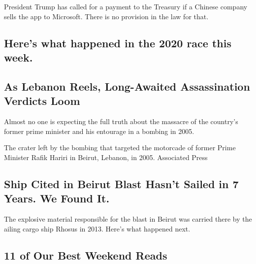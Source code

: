 President Trump has called for a payment to the Treasury if a Chinese
company sells the app to Microsoft. There is no provision in the law for
that.

\href{/2020/08/08/us/politics/trump-biden-polls-interview.html}{}

\hypertarget{heres-what-happened-in-the-2020-race-this-week}{%
\subsection{Here's what happened in the 2020 race this
week.}\label{heres-what-happened-in-the-2020-race-this-week}}

\href{/2020/08/08/world/middleeast/hariri-assassination-trial-hague.html}{}

\hypertarget{as-lebanon-reels-long-awaited-assassination-verdicts-loom}{%
\subsection{As Lebanon Reels, Long-Awaited Assassination Verdicts
Loom}\label{as-lebanon-reels-long-awaited-assassination-verdicts-loom}}

Almost no one is expecting the full truth about the massacre of the
country's former prime minister and his entourage in a bombing in 2005.

\href{/2020/08/08/world/middleeast/hariri-assassination-trial-hague.html}{}

The crater left by the bombing that targeted the motorcade of former
Prime Minister Rafik Hariri in Beirut, Lebanon, in 2005. Associated
Press

\href{/2020/08/07/world/middleeast/lebanon-explosion-ship.html}{}

\hypertarget{ship-cited-in-beirut-blast-hasnt-sailed-in-7-years-we-found-it}{%
\subsection{Ship Cited in Beirut Blast Hasn't Sailed in 7 Years. We
Found
It.}\label{ship-cited-in-beirut-blast-hasnt-sailed-in-7-years-we-found-it}}

The explosive material responsible for the blast in Beirut was carried
there by the ailing cargo ship Rhosus in 2013. Here's what happened
next.

\href{/2020/08/07/briefing/best-weekend-reads.html}{}

\hypertarget{11-of-our-best-weekend-reads}{%
\subsection{11 of Our Best Weekend
Reads}\label{11-of-our-best-weekend-reads}}

